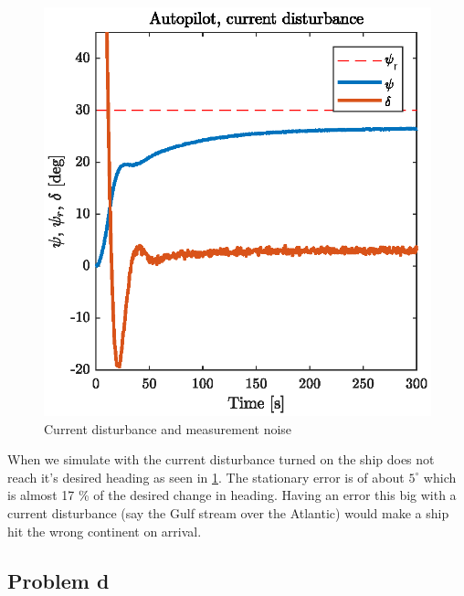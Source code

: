 \begin{figure}[h]
	\centering
	\includegraphics[width=\textwidth]{figures/p5p3c.eps}
	\caption{Current disturbance and measurement noise}
\label{fig:p5p3c_current_distur}
\end{figure}

When we simulate with the current disturbance turned on the ship does not reach it's desired heading as seen in \cref{fig:p5p3c_current_distur}. The stationary error is of about $5^\circ$ which is almost 17 \% of the desired change in heading. Having an error this big with a current disturbance (say the Gulf stream over the Atlantic) would make a ship hit the wrong continent on arrival.


\subsection{Problem d} \label{sec:Autopilot_d}

